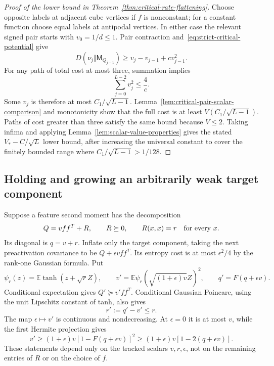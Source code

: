\begin{proof}[Proof of the lower bound in Theorem~\ref{thm:critical-rate-flattening}]
Choose opposite labels at adjacent cube vertices if $f$ is nonconstant;
for a constant function choose equal labels at antipodal vertices.
In either case the relevant signed pair starts with $v_0=1/d\le1$.
Pair contraction and~\eqref{eq:strict-critical-potential} give
\[
 D(\nu_j\Vert\mathsf M_{Q_{j-1}})
       \ge v_j-v_{j-1}+cv_{j-1}^2.
\]
For any path of total cost at most three, summation implies
\[
 \sum_{j=0}^{L-2}v_j^2\le\frac4c.
\]
Some $v_j$ is therefore at most $C_1/\sqrt{L-1}$.
Lemma~\ref{lem:critical-pair-scalar-comparison} and monotonicity show
that the full cost is at least $V(C_1/\sqrt{L-1})$.
Paths of cost greater than three satisfy the same bound because $V\le2$.
Taking infima and applying Lemma~\ref{lem:scalar-value-properties}
gives the stated $V_*-C/\sqrt L$ lower bound, after increasing the
universal constant to cover the finitely bounded range where
$C_1/\sqrt{L-1}>1/128$.
\end{proof}

\subsection{Holding and growing an arbitrarily weak target component}

Suppose a feature second moment has the decomposition
\[
 Q=vff^T+R,\qquad R\succeq0,\qquad R(x,x)=r\quad\hbox{for every }x.
\]
Its diagonal is $q=v+r$. Inflate only the target component, taking the
next preactivation covariance to be $Q+\epsilon vff^T$.
Its entropy cost is at most $\epsilon^2/4$ by the rank-one Gaussian
formula. Put
\[
 \psi_r(z)=\mathbb E\tanh(z+\sqrt rZ),\qquad
 v'=\mathbb E\psi_r(\sqrt{(1+\epsilon)v}Z)^2,
 \qquad q'=F(q+\epsilon v).
\]
Conditional expectation gives $Q'\succeq v'ff^T$.
Conditional Gaussian Poincare, using the unit Lipschitz constant of tanh,
also gives
\begin{equation}\label{eq:critical-residual-nonincreasing}
 r':=q'-v'\le r.
\end{equation}
The map $\epsilon\mapsto v'$ is continuous and nondecreasing. At
$\epsilon=0$ it is at most $v$, while the first Hermite projection gives
\begin{equation}\label{eq:critical-component-growth}
 v'\ge(1+\epsilon)v[1-F(q+\epsilon v)]^2
       \ge(1+\epsilon)v[1-2(q+\epsilon v)].
\end{equation}
These statements depend only on the tracked scalars $v,r,\epsilon$,
not on the remaining entries of $R$ or on the choice of $f$.

